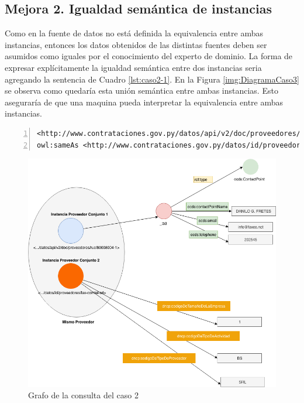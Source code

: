  \subsection{Mejora 2. Igualdad semántica de instancias}
 \label{section:caso2mejora2}
 Como en la fuente de datos no está definida la equivalencia entre ambas instancias, entonces los datos obtenidos de las distintas fuentes deben ser asumidos como iguales por el conocimiento del experto de dominio. La forma de expresar explícitamente la igualdad semántica entre dos instancias seria agregando la sentencia de Cuadro \ref{lst:caso2-1}. En la Figura \ref{img:DiagramaCaso3} se observa como quedaría esta unión semántica entre ambas instancias. Esto aseguraría de que una maquina pueda interpretar la equivalencia entre ambas instancias. 
 
 
\noindent\begin{minipage}[c]{\textwidth}
    \begin{lstlisting}[captionpos=b, caption=Declaración de igualdad semántica de dos instancias, label=lst:caso2-1,  numbers=left,  numberstyle=\tiny\color{mygray},frame=single]
<http://www.contrataciones.gov.py/datos/api/v2/doc/proveedores/ruc/80008004-1> 
owl:sameAs <http://www.contrataciones.gov.py/datos/id/proveedores/fax-comtel-srl>  .

     \end{lstlisting}
\end{minipage}
     \begin{figure}[ht!]
        \centering
        \includegraphics[width=150mm]{figuras/Diagramas-Caso2.png}
        \caption{Grafo de la consulta del caso 2}
        \label{img:DiagramaCaso2}
     \end{figure}


